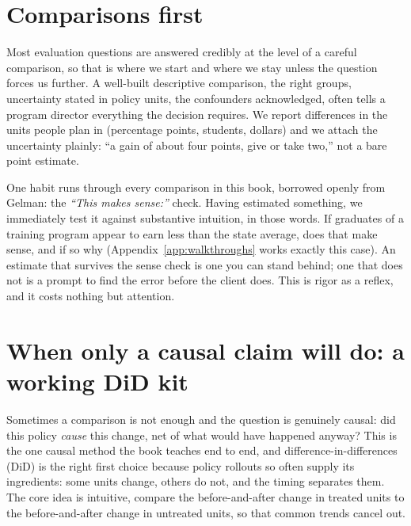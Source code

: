 \documentclass[
    a4paper,
    fontsize=10pt,
    twoside=true,
    numbers=noenddot,
]{kaobook}
\begin{document}
\section{Comparisons first}\label{sec:comparisons}
Most evaluation questions are answered credibly at the level of a careful comparison, so that is where we start and where we stay unless the question forces us further. A well-built descriptive comparison, the right groups, uncertainty stated in policy units, the confounders acknowledged, often tells a program director everything the decision requires. We report differences in the units people plan in (percentage points, students, dollars) and we attach the uncertainty plainly: \enquote{a gain of about four points, give or take two,} not a bare point estimate.

One habit runs through every comparison in this book, borrowed openly from Gelman: the \emph{\enquote{This makes sense:}} check. Having estimated something, we immediately test it against substantive intuition, in those words. If graduates of a training program appear to earn less than the state average, does that make sense, and if so why (Appendix~\ref{app:walkthroughs} works exactly this case). An estimate that survives the sense check is one you can stand behind; one that does not is a prompt to find the error before the client does. This is rigor as a reflex, and it costs nothing but attention.

\section{When only a causal claim will do: a working DiD kit}\label{sec:did}
Sometimes a comparison is not enough and the question is genuinely causal: did this policy \emph{cause} this change, net of what would have happened anyway? This is the one causal method the book teaches end to end, and difference-in-differences (DiD) is the right first choice because policy rollouts so often supply its ingredients: some units change, others do not, and the timing separates them. The core idea is intuitive, compare the before-and-after change in treated units to the before-and-after change in untreated units, so that common trends cancel out.
\end{document}
